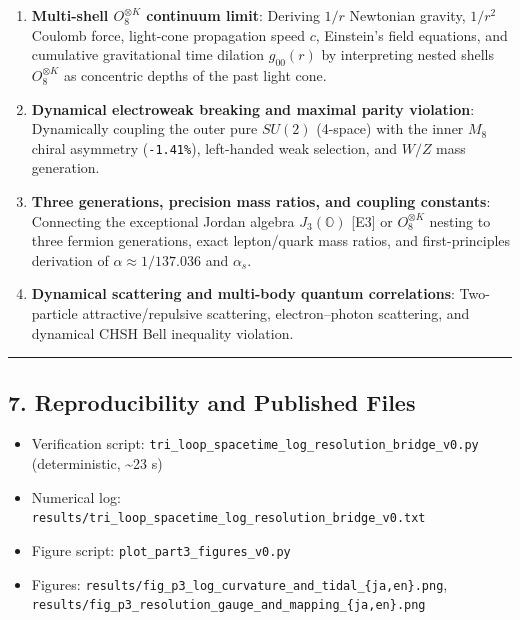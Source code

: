 \documentclass[
  a4paper,
]{article}
\providecommand{\tightlist}{%
  \setlength{\itemsep}{0pt}\setlength{\parskip}{0pt}}
\begin{document}
\begin{enumerate}
\def\labelenumi{\arabic{enumi}.}
\tightlist
\item
  \textbf{Multi-shell \(O_8^{\otimes K}\) continuum limit}: Deriving
  \(1/r\) Newtonian gravity, \(1/r^2\) Coulomb force, light-cone
  propagation speed \(c\), Einstein's field equations, and cumulative
  gravitational time dilation \(g_{00}(r)\) by interpreting nested
  shells \(O_8^{\otimes K}\) as concentric depths of the past light
  cone.
\item
  \textbf{Dynamical electroweak breaking and maximal parity violation}:
  Dynamically coupling the outer pure \(SU(2)\) (4-space) with the inner
  \(M_8\) chiral asymmetry (\texttt{-1.41\%}), left-handed weak
  selection, and \(W/Z\) mass generation.
\item
  \textbf{Three generations, precision mass ratios, and coupling
  constants}: Connecting the exceptional Jordan algebra
  \(J_3(\mathbb{O})\) {[}E3{]} or \(O_8^{\otimes K}\) nesting to three
  fermion generations, exact lepton/quark mass ratios, and
  first-principles derivation of \(\alpha \approx 1/137.036\) and
  \(\alpha_s\).
\item
  \textbf{Dynamical scattering and multi-body quantum correlations}:
  Two-particle attractive/repulsive scattering, electron--photon
  scattering, and dynamical CHSH Bell inequality violation.
\end{enumerate}

\begin{center}\rule{0.5\linewidth}{0.5pt}\end{center}

\subsection{7. Reproducibility and Published
Files}\label{reproducibility-and-published-files}

\begin{itemize}
\tightlist
\item
  Verification script:
  \texttt{tri\_loop\_spacetime\_log\_resolution\_bridge\_v0.py}
  (deterministic, \textasciitilde23 s)
\item
  Numerical log:
  \texttt{results/tri\_loop\_spacetime\_log\_resolution\_bridge\_v0.txt}
\item
  Figure script: \texttt{plot\_part3\_figures\_v0.py}
\item
  Figures:
  \texttt{results/fig\_p3\_log\_curvature\_and\_tidal\_\{ja,en\}.png},
  \texttt{results/fig\_p3\_resolution\_gauge\_and\_mapping\_\{ja,en\}.png}
\end{itemize}
\end{document}
